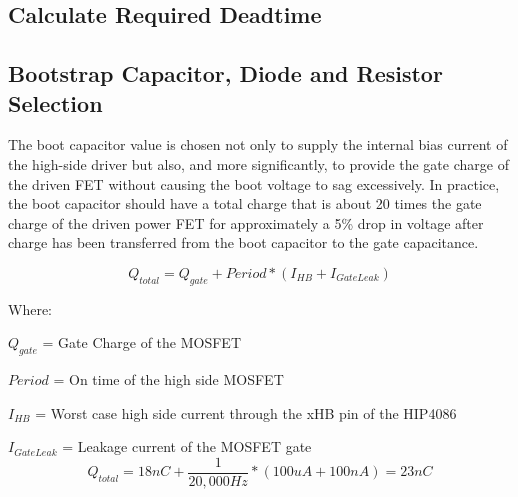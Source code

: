 \documentclass{article}
\begin{document}
\subsection{Calculate Required Deadtime}

\subsection{Bootstrap Capacitor, Diode and Resistor Selection}
\label{sec:bootstrap}
The boot capacitor value is chosen not only to supply the internal bias current of the high-side driver but also, and more significantly, to provide the gate charge of the driven FET without causing the boot voltage to sag excessively. In practice, the boot capacitor should have a total charge that is about 20 times the gate charge of the driven power FET for approximately a 5\% drop in voltage after charge has been transferred from the boot capacitor to the gate capacitance.

\[Q_{total} = Q_{gate} + Period * (I_{HB} + I_{GateLeak})\]

\noindent Where:

$Q_{gate}$ = Gate Charge of the MOSFET

$Period$ = On time of the high side MOSFET

$I_{HB}$ = Worst case high side current through the xHB pin of the HIP4086

$I_{GateLeak}$ = Leakage current of the MOSFET gate
\[Q_{total} = 18nC + \frac{1}{20,000Hz}*(100uA + 100 nA) = 23nC\]
\end{document}

